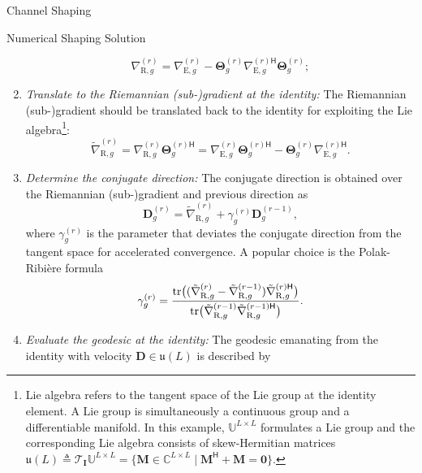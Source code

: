\documentclass[journal]{IEEEtran}
\begin{document}
\begin{section}{Channel Shaping}
\begin{subsection}{Numerical Shaping Solution}
\begin{enumerate}[label=(\roman*)]
\begin{equation}
					\label{eq:gradient_riem}
					\nabla_{\mathrm{R},g}^{(r)} = \nabla_{\mathrm{E},g}^{(r)} - \mathbf{\Theta}_g^{(r)} {\nabla_{\mathrm{E},g}^{(r)\mathsf{H}}} \mathbf{\Theta}_g^{(r)};
				\end{equation}
			\item \emph{Translate to the Riemannian (sub-)gradient at the identity:} The Riemannian (sub-)gradient should be translated back to the identity for exploiting the Lie algebra\footnote{Lie algebra refers to the tangent space of the Lie group at the identity element. A Lie group is simultaneously a continuous group and a differentiable manifold. In this example, $\mathbb{U}^{L \times L}$ formulates a Lie group and the corresponding Lie algebra consists of skew-Hermitian matrices $\mathfrak{u}(L) \triangleq \mathcal{T}_{\mathbf{I}}\mathbb{U}^{L \times L} = \{\mathbf{M} \in \mathbb{C}^{L \times L} \mid \mathbf{M}^\mathsf{H} + \mathbf{M} = \mathbf{0}\}$.}:
				\begin{equation}
					\label{eq:gradient_riem_tran}
					\tilde{\nabla}_{\mathrm{R},g}^{(r)} = \nabla_{\mathrm{R},g}^{(r)} \mathbf{\Theta}_g^{(r)\mathsf{H}} = \nabla_{\mathrm{E},g}^{(r)} \mathbf{\Theta}_g^{(r)\mathsf{H}} - \mathbf{\Theta}_g^{(r)} {\nabla_{\mathrm{E},g}^{(r)\mathsf{H}}}.
				\end{equation}
			\item \emph{Determine the conjugate direction:} The conjugate direction is obtained over the Riemannian (sub-)gradient and previous direction as
				\begin{equation}
					\label{eq:conjugate_dirn_geod}
					{\mathbf{D}}_g^{(r)} = \tilde{\nabla}_{\mathrm{R},g}^{(r)} + {\gamma}_g^{(r)} {\mathbf{D}}_g^{(r-1)},
				\end{equation}
				where $\gamma_g^{(r)}$ is the parameter that deviates the conjugate direction from the tangent space for accelerated convergence. A popular choice is the Polak-Ribi\`{e}re formula \cite{Hager2006}
				\begin{equation}
					\label{eq:conjugate_parm_geod}
					{\gamma}_g^{(r)} = \frac{\tr\bigl((\tilde{\nabla}_{\mathrm{R},g}^{(r)} - \tilde{\nabla}_{\mathrm{R},g}^{(r-1)}) {\tilde{\nabla}_{\mathrm{R},g}^{(r)\mathsf{H}}}\bigr)}{\tr\bigl(\tilde{\nabla}_{\mathrm{R},g}^{(r-1)} {\tilde{\nabla}_{\mathrm{R},g}^{(r-1)\mathsf{H}}}\bigr)}. %
				\end{equation}
			\item \emph{Evaluate the geodesic at the identity:} The geodesic emanating from the identity with velocity $\mathbf{D} \in \mathfrak{u}(L)$ is described by

\end{enumerate}
\end{subsection}
\end{section}
\end{document}

